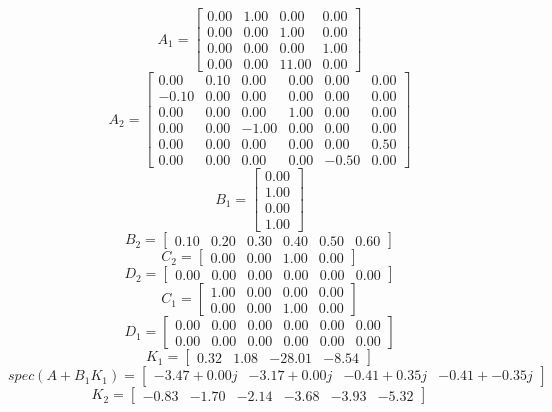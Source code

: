 \[A_1 = \begin{bmatrix}
  0.00 &  1.00 &  0.00 &  0.00\\
  0.00 &  0.00 &  1.00 &  0.00\\
  0.00 &  0.00 &  0.00 &  1.00\\
  0.00 &  0.00 &  11.00 &  0.00
\end{bmatrix}\]
\[A_2 = \begin{bmatrix}
  0.00 &  0.10 &  0.00 &  0.00 &  0.00 &  0.00\\
 -0.10 &  0.00 &  0.00 &  0.00 &  0.00 &  0.00\\
  0.00 &  0.00 &  0.00 &  1.00 &  0.00 &  0.00\\
  0.00 &  0.00 & -1.00 &  0.00 &  0.00 &  0.00\\
  0.00 &  0.00 &  0.00 &  0.00 &  0.00 &  0.50\\
  0.00 &  0.00 &  0.00 &  0.00 & -0.50 &  0.00
\end{bmatrix}\]
\[B_1 = \begin{bmatrix}
  0.00\\
  1.00\\
  0.00\\
  1.00
\end{bmatrix}\]
\[B_2 = \begin{bmatrix}
  0.10 &  0.20 &  0.30 &  0.40 &  0.50 &  0.60
\end{bmatrix}\]
\[C_2 = \begin{bmatrix}
  0.00 &  0.00 &  1.00 &  0.00
\end{bmatrix}\]
\[D_2 = \begin{bmatrix}
  0.00 &  0.00 &  0.00 &  0.00 &  0.00 &  0.00
\end{bmatrix}\]
\[C_1 = \begin{bmatrix}
  1.00 &  0.00 &  0.00 &  0.00\\
  0.00 &  0.00 &  1.00 &  0.00
\end{bmatrix}\]
\[D_1 = \begin{bmatrix}
  0.00 &  0.00 &  0.00 &  0.00 &  0.00 &  0.00\\
  0.00 &  0.00 &  0.00 &  0.00 &  0.00 &  0.00
\end{bmatrix}\]
\[K_1 = \begin{bmatrix}
  0.32 &  1.08 & -28.01 & -8.54
\end{bmatrix}\]
\[spec(A + B_1 K_1) = \begin{bmatrix}
 -3.47 + 0.00j & -3.17 + 0.00j & -0.41 + 0.35j & -0.41 + -0.35j
\end{bmatrix}\]
\[K_2 = \begin{bmatrix}
 -0.83 & -1.70 & -2.14 & -3.68 & -3.93 & -5.32
\end{bmatrix}\]


